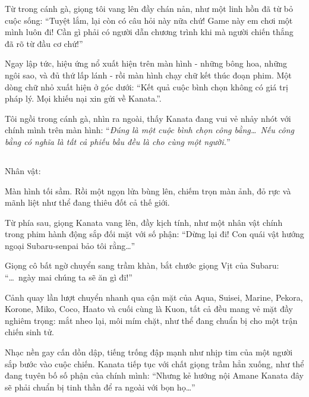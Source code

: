 \documentclass[../main.tex]{subfiles}
\begin{document}

Từ trong cánh gà, giọng tôi vang lên đầy chán nản, như một linh hồn đã từ bỏ cuộc sống: ``Tuyệt lắm, lại còn có câu hỏi này nữa chứ! Game này em chơi một mình luôn đi! Cần gì phải có người dẫn chương trình khi mà người chiến thắng đã rõ từ đầu cơ chứ!''

Ngay lập tức, hiệu ứng nổ xuất hiện trên màn hình - những bông hoa, những ngôi sao, và đủ thứ lấp lánh - rồi màn hình chạy chữ kết thúc đoạn phim. Một dòng chữ nhỏ xuất hiện ở góc dưới: ``Kết quả cuộc bình chọn không có giá trị pháp lý. Mọi khiếu nại xin gửi về Kanata.''.

Tôi ngồi trong cánh gà, nhìn ra ngoài, thấy Kanata đang vui vẻ nhảy nhót với chính mình trên màn hình: ``\textit{Đúng là một cuộc bình chọn công bằng\dots\ Nếu công bằng có nghĩa là tất cả phiếu bầu đều là cho cùng một người.}''

\newpage

\subsection*{\label{ep-S7.VI}}
\vspace{-4pt}
\begin{center}
  {\caviar\fontsize{12pt}{12pt}\selectfont Nhân vật:          }
\end{center}

\pov{-}

Màn hình tối sầm. Rồi một ngọn lửa bùng lên, chiếm trọn màn ảnh, đỏ rực và mãnh liệt như thể đang thiêu đốt cả thế giới.

Từ phía sau, giọng Kanata vang lên, đầy kịch tính, như một nhân vật chính trong phim hành động sắp đối mặt với số phận: ``Dừng lại đi! Con quái vật hướng ngoại Subaru-senpai bảo tôi rằng\dots''

Giọng cô bất ngờ chuyển sang trầm khàn, bắt chước giọng Vịt của Subaru: ``\dots\ ngày mai chúng ta sẽ ăn gì đi!''

Cảnh quay lần lượt chuyển nhanh qua cận mặt của Aqua, Suisei, Marine, Pekora, Korone, Miko, Coco, Haato và cuối cùng là Kuon, tất cả đều mang vẻ mặt đầy nghiêm trọng: mắt nheo lại, môi mím chặt, như thể đang chuẩn bị cho một trận chiến sinh tử.

Nhạc nền gay cấn dồn dập, tiếng trống đập mạnh như nhịp tim của một người sắp bước vào cuộc chiến. Kanata tiếp tục với chất giọng trầm hẳn xuống, như thể đang tuyên bố số phận của chính mình: ``Nhưng kẻ hướng nội Amane Kanata đây sẽ phải chuẩn bị tinh thần để ra ngoài với bọn họ\dots''
\end{document}
